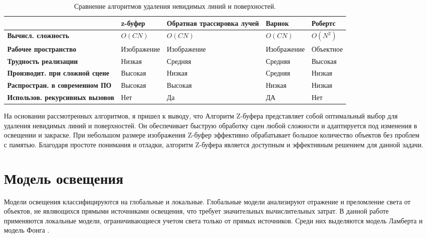 \begin{table}[h!]
	\centering
	\caption{\raggedleft Сравнение алгоритмов удаления невидимых линий и поверхностей.}\label{table:1}
	\begin{tabularx}{\textwidth}{|X|X|X|X|X|}
		\hline
		& \textbf{z-буфер} & \textbf{Обратная трассировка лучей} & \textbf{Варнок} & \textbf{Робертс} \\
		\hline
		\textbf{Вычисл. сложность} & $O(CN)$ & $O(CN)$ & $O(CN)$ & $O(N^2)$ \\
		\hline
		\textbf{Рабочее пространство} & Изображение & Изображение & Изображение & Объектное \\
		\hline
		\textbf{Трудность \newline реализации} & Низкая & Средняя & Средняя & Высокая \\
		\hline
		\textbf{Производит. при сложной сцене} & Высокая & Низкая & Средняя & Низкая \\
		\hline
		\textbf{Распростран. в современном ПО} & Высокая & Высокая & Низкая & Низкая \\
		\hline
		\textbf{Использов. рекурсивных вызовов} & Нет & Да & ДА & Нет \\
		\hline
	\end{tabularx}
\end{table}




На основании рассмотренных алгоритмов, я пришел к выводу, что  Алгоритм Z-буфера представляет собой оптимальный выбор для удаления невидимых линий и поверхностей. Он обеспечивает быструю обработку сцен любой сложности и адаптируется под изменения в освещении и закраске. При небольшом размере изображения Z-буфер эффективно обрабатывает большое количество объектов без проблем с памятью. Благодаря простоте понимания и отладки, алгоритм Z-буфера является доступным и эффективным решением для данной задачи.


\section{Модель освещения}

Модели освещения классифицируются на глобальные и локальные. Глобальные модели анализируют отражение и преломление света от объектов, не являющихся прямыми источниками освещения, что требует значительных вычислительных затрат. В данной работе применяются локальные модели, ограничивающиеся учетом света только от прямых источников. Среди них выделяются модель Ламберта и модель Фонга \cite{lightmodfv}.


